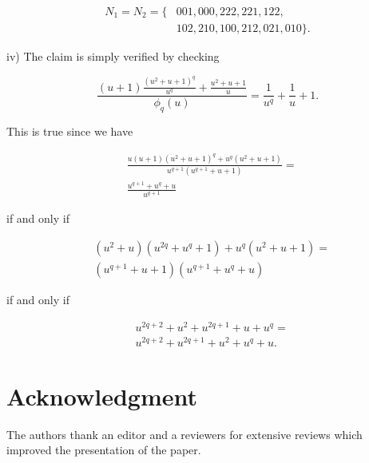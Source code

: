 \documentclass[10pt]{article}
\begin{document}
$$
\begin{aligned}
N_{1}=N_{2}=\{ & 001,000,222,221,122, \\
& 102,210,100,212,021,010\} .
\end{aligned}
$$

iv) The claim is simply verified by checking

$$
\frac{(u+1) \frac{\left(u^{2}+u+1\right)^{q}}{u^{q}}+\frac{u^{2}+u+1}{u}}{\phi_{q}(u)}=\frac{1}{u^{q}}+\frac{1}{u}+1 .
$$

This is true since we have

$$
\begin{aligned}
& \frac{u(u+1)\left(u^{2}+u+1\right)^{q}+u^{q}\left(u^{2}+u+1\right)}{u^{q+1}\left(u^{q+1}+u+1\right)}= \\
& \frac{u^{q+1}+u^{q}+u}{u^{q+1}}
\end{aligned}
$$

if and only if

$$
\begin{aligned}
& \left(u^{2}+u\right)\left(u^{2 q}+u^{q}+1\right)+u^{q}\left(u^{2}+u+1\right)= \\
& \left(u^{q+1}+u+1\right)\left(u^{q+1}+u^{q}+u\right)
\end{aligned}
$$

if and only if

$$
\begin{aligned}
& u^{2 q+2}+u^{2}+u^{2 q+1}+u+u^{q}= \\
& u^{2 q+2}+u^{2 q+1}+u^{2}+u^{q}+u .
\end{aligned}
$$

\section*{Acknowledgment}
The authors thank an editor and a reviewers for extensive reviews which improved the presentation of the paper.
\end{document}
